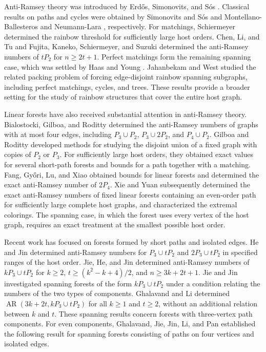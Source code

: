 \documentclass[12pt]{article}
\DeclareMathOperator{\AR}{AR}
\begin{document}
Anti-Ramsey theory was introduced by Erd\H{o}s, Simonovits, and S\'os
\cite{ESS}. Classical results on paths and cycles were obtained by
Simonovits and S\'os \cite{SS} and Montellano-Ballesteros and
Neumann-Lara \cite{MBNL}, respectively. For matchings, Schiermeyer
\cite{Sch} determined the rainbow threshold for sufficiently large
host orders. Chen, Li, and Tu \cite{CLT} and Fujita, Kaneko,
Schiermeyer, and Suzuki \cite{FKSS} determined the anti-Ramsey numbers
of $tP_2$ for $n\ge2t+1$. Perfect matchings form the remaining
spanning case, which was settled by Haas and Young \cite{HY}.
Jahanbekam and West \cite{JW} studied the related packing problem of
forcing edge-disjoint rainbow spanning subgraphs, including perfect
matchings, cycles, and trees. These results provide a broader setting
for the study of rainbow structures that cover the entire host graph.

Linear forests have also received substantial attention in anti-Ramsey
theory. Bialostocki, Gilboa, and Roditty \cite{BGR} determined the
anti-Ramsey numbers of graphs with at most four edges, including
$P_3\cup P_2$, $P_3\cup2P_2$, and $P_4\cup P_2$.
Gilboa and Roditty \cite{GR} developed methods for studying the
disjoint union of a fixed graph with copies of $P_2$ or $P_3$.
For sufficiently large host orders, they obtained exact values for
several short-path forests and bounds for a path together with a
matching. Fang, Gy\H{o}ri, Lu, and Xiao \cite{FGLX} obtained bounds for
linear forests and determined the exact anti-Ramsey number of $2P_4$.
Xie and Yuan \cite{XY} subsequently determined the exact anti-Ramsey
numbers of fixed linear forests containing an even-order path for
sufficiently large complete host graphs, and characterized the extremal
colorings. The spanning case, in which the forest uses every vertex of
the host graph, requires an exact treatment at the smallest possible
host order.

Recent work has focused on forests formed by short paths and isolated
edges. He and Jin \cite{HJ} determined anti-Ramsey numbers for
$P_3\cup tP_2$ and $2P_3\cup tP_2$ in specified ranges of the host order.
Jie, He, and Jin \cite{JHJ} determined anti-Ramsey numbers of
$kP_3\cup tP_2$ for $k\ge2$, $t\ge(k^2-k+4)/2$, and
$n\ge3k+2t+1$.
Jie and Jin \cite{JJ} investigated spanning forests of the form
$kP_3\cup tP_2$ under a condition relating the numbers of the two types
of components. Ghalavand and Li \cite{GL} determined
$\AR(3k+2t,kP_3\cup tP_2)$ for all $k\ge1$ and $t\ge2$, without
an additional relation between $k$ and $t$.
These spanning results concern forests with three-vertex path components.
For even components, Ghalavand, Jie, Jin, Li, and Pan
\cite{GJJLP} established the following result for spanning forests
consisting of paths on four vertices and isolated edges.
\end{document}

